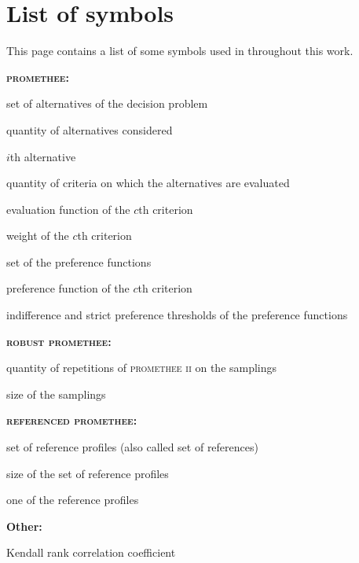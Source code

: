 \chapter*{List of symbols}

This page contains a list of some symbols used in throughout this work.

{ \bf \textsc{promethee}:}
\begin{description}[leftmargin=!,labelwidth=\widthof{\bfseries $P_c()$}]
    \item[$A$] set of alternatives of the decision problem
    \item[$n$] quantity of alternatives considered
    \item[$a_i$] $i$th alternative
    \item[$k$] quantity of criteria on which the alternatives are evaluated
    \item[$f_c()$] evaluation function of the $c$th criterion
    \item[$w_c$] weight of the $c$th criterion
    \item[$\mathcal{P}$] set of the preference functions
    \item[$P_c()$] preference function of the $c$th criterion
    \item[$q, p$] indifference and strict preference thresholds of the preference functions
\end{description}

\vskip 0.4cm
{ \bf \textsc{robust promethee}:}
\begin{description}[leftmargin=!,labelwidth=\widthof{\bfseries $P_c()$}]
    \item[$R$] quantity of repetitions of \textsc{promethee ii} on the samplings
    \item[$m$] size of the samplings
\end{description}

\vskip 0.4cm
{ \bf \textsc{referenced promethee}:}
\begin{description}[leftmargin=!,labelwidth=\widthof{\bfseries $P_c()$}]
    \item[$\mathcal{R}$] set of reference profiles (also called set of references)
    \item[$p$] size of the set of reference profiles
    \item[$r$] one of the reference profiles
\end{description}


\vskip 0.4cm
{ \bf Other:}
\begin{description}[leftmargin=!,labelwidth=\widthof{\bfseries $P_c()$}]
    \item[$\tau_k$] Kendall rank correlation coefficient
\end{description}
